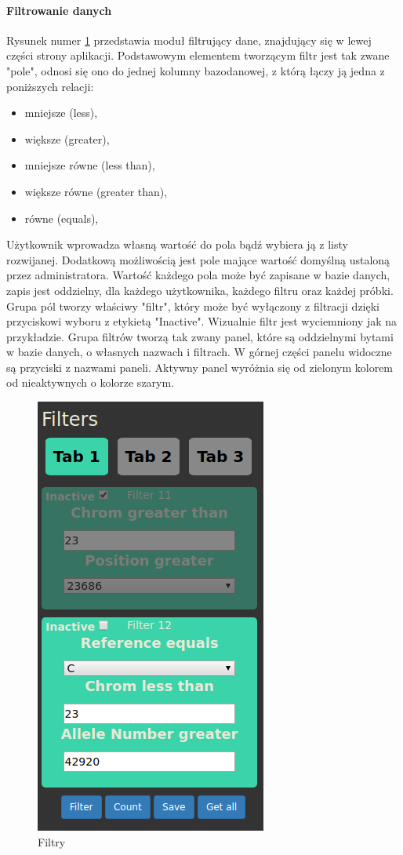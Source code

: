 \documentclass[a4paper,12pt,twoside]{article}
\begin{document}
\newpage
\paragraph{Filtrowanie danych}
Rysunek numer \ref{fig:filterspic} przedstawia moduł filtrujący dane, znajdujący się w
lewej części strony aplikacji.
Podstawowym elementem tworzącym filtr jest tak zwane "pole", odnosi się ono do jednej kolumny
bazodanowej, z którą łączy ją jedna z poniższych relacji: 

\begin{itemize}
\item mniejsze (less),
\item większe (greater),
\item mniejsze równe (less than),
\item większe równe (greater than),
\item równe (equals),
\end{itemize} 

Użytkownik wprowadza własną wartość do pola bądź wybiera ją z listy rozwijanej.   
Dodatkową możliwością jest pole mające wartość domyślną ustaloną przez administratora. 
Wartość każdego pola może być zapisane w bazie danych, zapis jest oddzielny, dla każdego 
użytkownika, każdego filtru oraz każdej próbki.
Grupa pól tworzy właściwy "filtr", który może być wyłączony z filtracji dzięki
przyciskowi wyboru z etykietą "Inactive". Wizualnie filtr jest wyciemniony jak na przykładzie.
Grupa filtrów tworzą tak zwany panel, które są oddzielnymi bytami w bazie danych, o własnych nazwach i filtrach.
W górnej części panelu widoczne są przyciski z nazwami paneli. Aktywny panel
wyróżnia się od zielonym kolorem od nieaktywnych o kolorze szarym. 

\begin{figure}
  \centering
  \includegraphics{obrazy/aplikacja/filters.png}
  \caption{Filtry}
  \label{fig:filterspic}
\end{figure}
\end{document}
